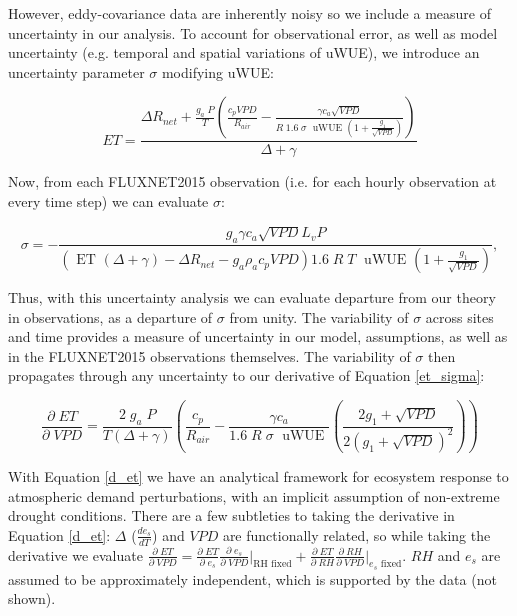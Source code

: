 \documentclass[draft,linenumbers]{agujournal}
\begin{document}
However, eddy-covariance data are inherently noisy so we include a
measure of uncertainty in our analysis. To account for observational
error, as well as model uncertainty (e.g. temporal and spatial
variations of uWUE), we introduce an uncertainty parameter $\sigma$
modifying uWUE:

\begin{linenomath*}
  \begin{equation} ET = \frac{\Delta R_{net} + \frac{g_a\; P}{T}
\left( \frac{ c_p VPD}{R_{air}} - \frac{\gamma c_a \sqrt{VPD} }{ R \;
1.6\; \sigma \; \text{ uWUE } (1 + \frac{g_1}{\sqrt{VPD}})} \right) }{
\Delta + \gamma}
    \label{et_sigma}
  \end{equation}
\end{linenomath*}

Now, from each FLUXNET2015 observation (i.e. for each hourly
observation at every time step) we can evaluate $\sigma$:

\begin{linenomath*}
  \begin{equation} \sigma = - \frac{g_a \gamma c_a \sqrt{VPD} L_v P }{
\left(\text{ ET } ( \Delta + \gamma) - \Delta R_{net} - g_a \rho_a c_p
VPD\right) 1.6 \; R\; T\; \text{ uWUE } (1 + \frac{g_1}{\sqrt{VPD}})},
    \label{sigma}
  \end{equation}
\end{linenomath*}

Thus, with this uncertainty analysis we can evaluate departure from
our theory in observations, as a departure of $\sigma$ from unity. The
variability of $\sigma$ across sites and time provides a measure of
uncertainty in our model, assumptions, as well as in the FLUXNET2015
observations themselves. The variability of $\sigma$ then propagates
through any uncertainty to our derivative of Equation \ref{et_sigma}:

\begin{linenomath*}
  \begin{equation} \frac{\partial \; ET}{\partial \; VPD} = \frac{2\;
g_a \; P}{T(\Delta + \gamma)} \left(\frac{ c_p}{R_{air}} -
\frac{\gamma c_a }{1.6 \; R\; \sigma \; \text{ uWUE }} \left( \frac{2
g_1 + \sqrt{VPD}}{2 (g_1 + \sqrt{VPD})^2}\right) \right)
    \label{d_et}
  \end{equation}
\end{linenomath*}

With Equation \ref{d_et} we have an analytical framework for ecosystem
response to atmospheric demand perturbations, with an implicit
assumption of non-extreme drought conditions. There are a few
subtleties to taking the derivative in Equation \ref{d_et}: $\Delta$
($\frac{d e_{s}}{d T}$) and $VPD$ are functionally related, so while
taking the derivative we evaluate $\frac{\partial \; ET}{\partial \;
VPD} = \frac{\partial \; ET} {\partial \; e_s} \frac{\partial \;
e_s}{\partial \; VPD} \Big|_{\text{RH fixed}} + \frac{\partial \;
ET}{\partial \; RH} \frac{\partial \; RH}{\partial \; VPD}
\Big|_{\text{$e_s$ fixed}}$. $RH$ and $e_s$ are assumed to be
approximately independent, which is supported by the data (not shown).
\end{document}
